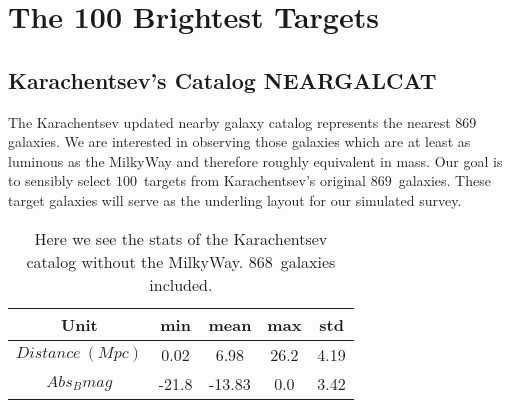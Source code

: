 \documentclass[11pt,a4paper,fleqn,notitlepage,oneside]{article}
\begin{document}
	\section[Observation Targets]{The 100 Brightest Targets} %
		\label{sec:the_100_brightest_targets}

		\subsection[NEARGALCAT]{Karachentsev's Catalog NEARGALCAT} %
			\label{sub:karachentsev_catalog_neargalcat}
			The Karachentsev\cite{2013AJ....145..101K} updated nearby galaxy catalog represents the nearest 869 galaxies.
			We are interested in observing those galaxies which are at least as luminous as the MilkyWay and therefore roughly equivalent in mass.
			Our goal is to sensibly select $100$\ targets from Karachentsev's original $869$\ galaxies.
			These target galaxies will serve as the underling layout for our simulated survey.

			\begin{table}[H]\centering
				\label{tab:karachentsev_catalog_neargalcat}
					\begin{tabular}{||c|cccc||}
						\hline 
						Unit & min & mean & max & std \\
						\midrule[1.5pt]
						$Distance\ (Mpc)$ & 0.02 & 6.98 & 26.2 & 4.19 \\
						$Abs_{B}mag$ & -21.8 & -13.83 & 0.0 & 3.42 \\
						\hline
					\end{tabular}
				\caption{
					Here we see the stats of the Karachentsev\cite{2013AJ....145..101K} catalog without the MilkyWay.
					$868$\ galaxies included.
					}
			\end{table}
\end{document}
